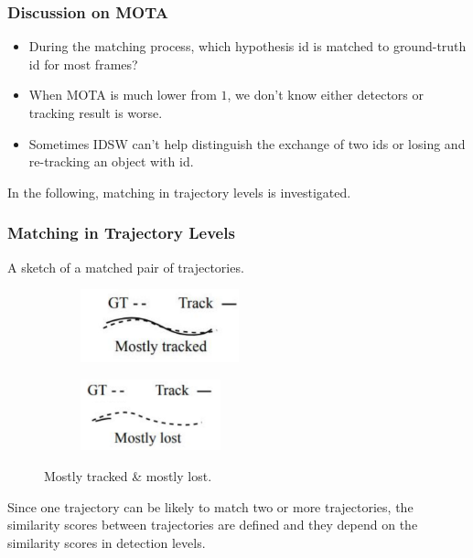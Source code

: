 \documentclass[slidetop, mathserif]{beamer}
\begin{document}
\begin{frame}
	\frametitle{Discussion on MOTA}

	\begin{itemize}
	\item During the matching process, which hypothesis id is matched to ground-truth id for most frames?
	\item When MOTA is much lower from $1$, we don't know either detectors or tracking result is worse.
	\item Sometimes IDSW can't help distinguish the exchange of two ids or
		losing and re-tracking an object with id.
	\end{itemize}

	\vspace{5pt}

	In the following, matching in trajectory levels is investigated.

\end{frame}


\begin{frame}
	\frametitle{Matching in Trajectory Levels}

	A sketch of a matched pair of trajectories.
	\begin{figure}
		\begin{subfigure}{.5\textwidth}
			\centering
			\includegraphics[width=130pt]{pics/fig4.png}
		\end{subfigure}%
		\begin{subfigure}{.5\textwidth}
			\centering
			\includegraphics[width=115pt]{pics/fig5.png}
		\end{subfigure}
		\caption{Mostly tracked \& mostly lost.}
	\end{figure}

	\vspace{-5pt}
	Since one trajectory can be likely to match two or more trajectories,
	the similarity scores between trajectories are defined
	and they depend on the similarity scores in detection levels.
			
\end{frame}
\end{document}
